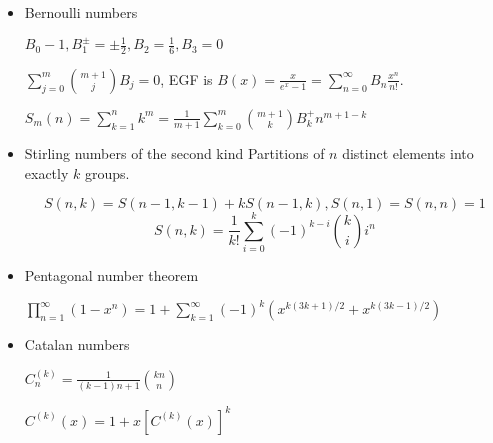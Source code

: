 \begin{itemize}
\item Bernoulli numbers

$B_0-1,B_1^{\pm}=\pm\frac{1}{2},B_2=\frac{1}{6},B_3=0$

$\displaystyle\sum_{j=0}^m\binom{m+1}{j}B_j=0$, EGF is $B(x) = \frac{x}{e^x - 1}=\displaystyle\sum_{n=0}^\infty B_n\frac{x^n}{n!}$.

$S_m(n)=\displaystyle\sum_{k=1}^nk^m=\frac{1}{m+1}\sum_{k=0}^m\binom{m+1}{k}B^{+}_kn^{m+1-k}$

\item Stirling numbers of the second kind
Partitions of $n$ distinct elements into exactly $k$ groups. 

\[ S(n, k) = S(n - 1, k - 1) + kS(n - 1, k), S(n, 1) = S(n, n) = 1 \]
\[ S(n, k) = \frac{1}{k!}\sum_{i=0}^{k}(-1)^{k-i}{k \choose i}i^n \]

\item Pentagonal number theorem

$\displaystyle\prod_{n=1}^{\infty}(1-x^n)=1+\sum_{k=1}^{\infty}(-1)^k\left(x^{k(3k+1)/2} + x^{k(3k-1)/2}\right)$

\item Catalan numbers

$C^{(k)}_n = \displaystyle \frac{1}{(k - 1)n + 1}\binom{kn}{n}$

$C^{(k)}(x) = 1 + x [C^{(k)}(x)]^k$
\end{itemize}
